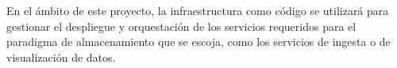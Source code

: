 En el ámbito de este proyecto, la infraestructura como código se utilizará para
gestionar el despliegue y orquestación de los servicios requeridos para el
paradigma de almacenamiento que se escoja, como los servicios de ingesta o de
visualización de datos.

